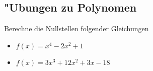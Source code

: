 \subsection{"Ubungen zu Polynomen}
Berechne die Nullstellen folgender Gleichungen
\begin{itemize}
\item $f(x) = x^4 - 2x^2 + 1$
\item $f(x) = 3x^3 + 12x^2 + 3x - 18$
\end{itemize}